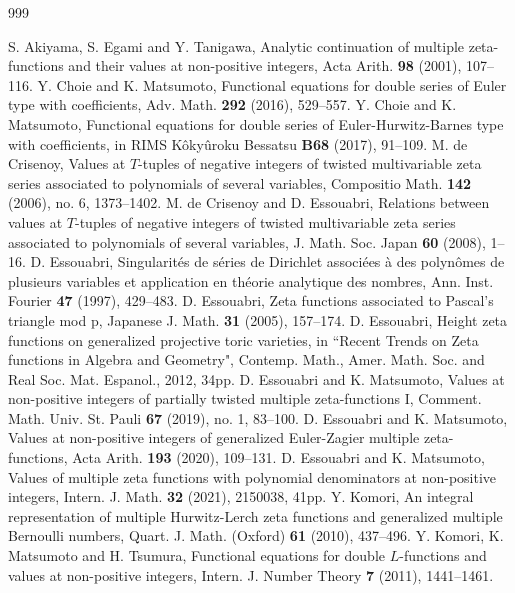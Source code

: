 \documentclass[a4paper,12pt]{article}
\theoremstyle{definition}
\numberwithin{equation}{section}
\begin{document}
\begin{thebibliography}{999}

S. Akiyama, S. Egami and Y. Tanigawa,
Analytic continuation of multiple zeta-functions and their values at non-positive integers,
Acta Arith. {\bf 98} (2001), 107--116.
Y. Choie and K. Matsumoto,
Functional equations for double series of Euler type with
coefficients,
Adv. Math. {\bf 292} (2016), 529--557.
Y. Choie and K. Matsumoto,
Functional equations for double series of Euler-Hurwitz-Barnes type with coefficients, 
in RIMS K{\^o}ky{\^u}roku Bessatsu {\bf B68} (2017), 91--109.
M. de Crisenoy,
Values at $T$-tuples of negative integers of twisted multivariable zeta series associated to polynomials of several variables, Compositio Math. {\bf 142} (2006), no. 6, 1373--1402.
M. de Crisenoy and D. Essouabri,
Relations between values at {$T$}-tuples of negative integers of twisted multivariable zeta series associated to polynomials of several variables, J. Math. Soc. Japan {\bf 60} (2008), 1--16.
D. Essouabri,
Singularit{\'e}s de s{\'e}ries de Dirichlet associ{\'e}es {\`a} des polyn{\^o}mes de plusieurs
variables et application en th{\'e}orie analytique des nombres, 
Ann. Inst. Fourier {\bf 47} (1997), 429--483.
D. Essouabri,
Zeta functions associated to Pascal's triangle mod p, Japanese J. Math. {\bf 31} (2005), 157--174.
D. Essouabri,
Height zeta functions on generalized projective toric varieties, in ``Recent Trends on Zeta functions in Algebra and Geometry", Contemp. Math., Amer. Math. Soc. and Real Soc. 
Mat. Espanol., 2012, 34pp.
D. Essouabri and K. Matsumoto,
Values at non-positive integers of partially twisted multiple zeta-functions I, Comment. Math. Univ. St. Pauli {\bf 67} (2019), no. 1, 83--100.
D. Essouabri and K. Matsumoto,
Values at non-positive integers of generalized Euler-Zagier multiple zeta-functions,
Acta Arith. {\bf 193} (2020), 109--131. 
D. Essouabri and K. Matsumoto,
Values of multiple zeta functions with polynomial denominators at non-positive integers,
Intern. J. Math. {\bf 32} (2021), 2150038, 41pp. 
Y. Komori,
An integral representation of multiple Hurwitz-Lerch zeta functions and generalized multiple
Bernoulli numbers, Quart. J. Math. (Oxford) {\bf 61} (2010), 437--496. 
Y. Komori, K. Matsumoto and H. Tsumura,
Functional equations for double $L$-functions and values at
non-positive integers,
Intern. J. Number Theory {\bf 7} (2011), 1441--1461.

\end{thebibliography}
\end{document}
